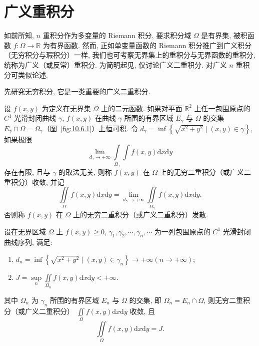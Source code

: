 \section{广义重积分}\label{sec:10.6}

如前所知, $n$ 重积分作为多变量的 Riemann 积分, 要求积分域 $\Omega$ 是有界集, 被积函数
$f\colon \Omega \to \mathbb{R}$ 为有界函数. 然而, 正如单变量函数的 Riemann 积分推广到广义积分（无穷积分与瑕积分）一样,
我们也可考察无界集上的重积分与无界函数的重积分, 统称为广义（或反常）重积分.
为简明起见, 仅讨论广义二重积分. 对广义 $n$ 重积分可类似论述.

先研究无穷积分, 它是一类重要的广义二重积分.

\begin{definition}[无界集上的二重积分]\label{def:10.6.1}
设 $f(x, y)$ 为定义在无界集 $\Omega$ 上的二元函数.
如果对平面 $\mathbb{R}^{2}$ 上任一包围原点的 $C^{1}$ 光滑封闭曲线 $\gamma$,
$f(x, y)$ 在曲线 $\gamma$ 所围的有界区域 $E_{\gamma}$ 与 $\Omega$ 的交集
$E_{\gamma} \cap \Omega = \Omega_{\gamma}$（图~\ref{fig:10.6.1}）上恒可积.
令 $d_{\gamma} = \inf\left\{ \sqrt{x^{2} + y^{2}} \mid (x, y) \in \gamma \right\}$,
如果极限
\[
\lim_{d_{\gamma} \to +\infty} \int\limits_{\Omega_{\gamma}} \int f(x,y) \mathrm{d}x\mathrm{d}y
\]
存在有限, 且与 $\gamma$ 的取法无关, 则称 $f(x, y)$ 在 $\Omega$ 上的无穷二重积分（或广义二重积分）收敛, 并记
\[
\iint\limits_{\Omega} f(x,y) \mathrm{d}x\mathrm{d}y
= \lim_{d_{\gamma} \to +\infty} \iint\limits_{\Omega_{\gamma}} f(x,y) \mathrm{d}x\mathrm{d}y.
\]
否则称 $f(x, y)$ 在 $\Omega$ 上的无穷二重积分（或广义二重积分）发散.
\end{definition}

\begin{theorem}\label{thm:10.6.1}
设在无界区域 $\Omega$ 上 $f(x, y) \geqslant 0$,
$\gamma_{1}, \gamma_{2}, \cdots, \gamma_{n}, \cdots$ 为一列包围原点的 $C^{1}$ 光滑封闭曲线序列, 满足:
\begin{enumerate}
\item[(1)] $d_{n} = \inf\left\{ \sqrt{x^{2} + y^{2}} \mid (x, y) \in \gamma_{n} \right\}
  \to +\infty (n \to +\infty)$;
\item[(2)] $J = \sup\limits_{n} \iint\limits_{\Omega_{n}} f(x,y) \mathrm{d}x\mathrm{d}y < +\infty$.
\end{enumerate}
其中 $\Omega_{n}$ 为 $\gamma_{n}$ 所围的有界区域 $E_{n}$ 与 $\Omega$ 的交集, 即
$\Omega_{n} = E_{n} \cap \Omega$, 则无穷二重积分（或广义二重积分）
$\iint\limits_{\Omega} f(x,y) \mathrm{d}x\mathrm{d}y$ 收敛, 且
\[
\iint\limits_{\Omega} f(x,y) \mathrm{d}x\mathrm{d}y = J.
\]
\end{theorem}

